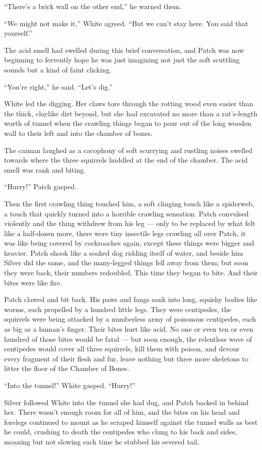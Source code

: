 \documentclass[ebook,oneside,openany,17pt]{memoir}
\begin{document}
“There’s a brick wall on the other end,” he warned them.

“We might not make it,” White agreed. “But we can’t stay here. You
said that yourself.”

The acid smell had swelled during this brief conversation, and Patch
was now beginning to fervently hope he was just imagining not just the
soft scuttling sounds but a kind of faint clicking.

“You’re right,” he said. “Let’s dig.”

White led the digging. Her claws tore through the rotting wood even
easier than the thick, claylike dirt beyond, but she had excavated no
more than a rat’s-length worth of tunnel when the crawling things
began to pour out of the long wooden wall to their left and into the
chamber of bones.

The caiman laughed as a cacophony of soft scurrying and rustling
noises swelled towards where the three squirrels huddled at the end of
the chamber. The acid smell was rank and biting.

“Hurry!” Patch gasped.

Then the first crawling thing touched him, a soft clinging touch like
a spiderweb, a touch that quickly turned into a horrible crawling
sensation. Patch convulsed violently and the thing withdrew from his
leg — only to be replaced by what felt like a half-dozen more, there
were tiny insectile legs crawling all over Patch, it was like being
covered by cockroaches again, except these things were bigger and
heavier. Patch shook like a soaked dog ridding itself of water, and
beside him Silver did the same, and the many-legged things fell away
from them; but soon they were back, their numbers redoubled. This time
they began to bite. And their bites were like fire.

Patch clawed and bit back. His paws and fangs sank into long, squishy
bodies like worms, each propelled by a hundred little legs. They were
centipedes, the squirrels were being attacked by a numberless army of
poisonous centipedes, each as big as a human’s finger. Their bites
hurt like acid. No one or even ten or even hundred of those bites
would be fatal — but soon enough, the relentless wave of centipedes
would cover all three squirrels, kill them with poison, and devour
every fragment of their flesh and fur, leave nothing but three more
skeletons to litter the floor of the Chamber of Bones.

“Into the tunnel!” White gasped. “Hurry!”

Silver followed White into the tunnel she had dug, and Patch backed in
behind her. There wasn’t enough room for all of him, and the bites on
his head and forelegs continued to mount as he scraped himself against
the tunnel walls as best he could, crushing to death the centipedes
who clung to his back and sides, moaning but not slowing each time he
stubbed his severed tail.
\end{document}

